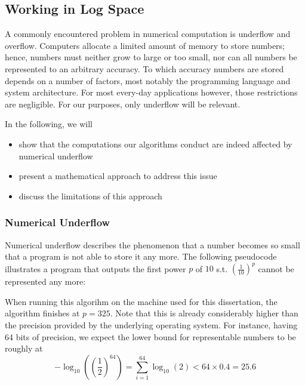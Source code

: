 \subsection{Working in Log Space}

A commonly encountered problem in numerical computation is underflow and overflow. Computers allocate a limited amount of memory to store numbers; hence, numbers must neither grow to large or too small, nor can all numbers be represented to an arbitrary accuracy. To which accuracy numbers are stored depends on a number of factors, most notably the programming language and system architecture. For most every-day applications however, those restrictions are negligible. For our purposes, only underflow will be relevant. 

In the following, we will 
\begin{itemize}
	\item show that the computations our algorithms conduct are indeed affected by numerical underflow
	\item present a mathematical approach to address this issue
	\item discuss the limitations of this approach
\end{itemize}


\subsubsection*{Numerical Underflow}
Numerical underflow describes the phenomenon that a number becomes so small that a program is not able to store it any more. The following pseudocode illustrates a program that outputs the first power $p$ of $10$ s.t. $\left(\frac{1}{10}\right)^p$ cannot be represented any more:


When running this algorihm on the machine used for this dissertation, the algorithm finishes at $p=325$. Note that this is already considerably higher than the precision provided by the underlying operating system. For instance, having 64 bits of precision, we expect the lower bound for representable numbers to be roughly at 
\[
- \log_{10}\left(
	\left(\frac{1}{2}\right)^{64}
\right) = 
\sum_{i=1}^{64} \log_{10} \left(2\right)
< 64 \times  0.4 =  25.6
\]


